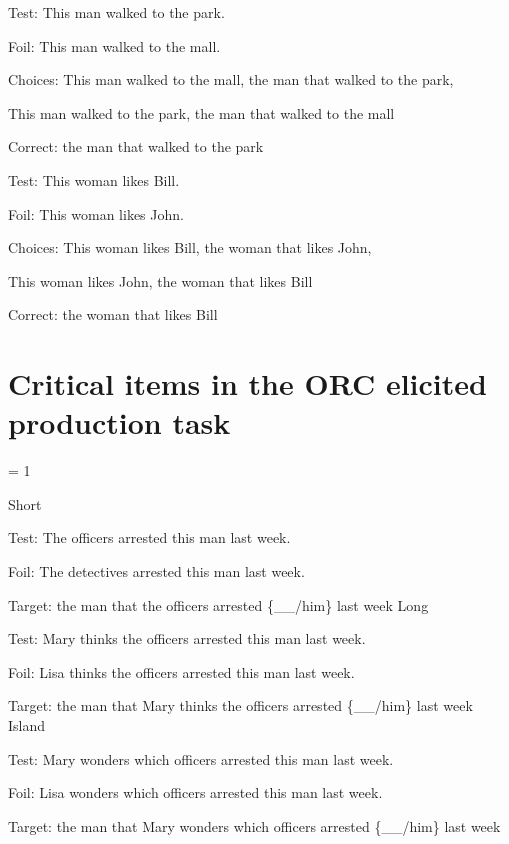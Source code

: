 \ex %
Test: This man walked to the park.\par\nobreak
Foil: This man walked to the mall.\par\nobreak
Choices: This man walked to the mall, the man that walked to the park,\par\nobreak
This man walked to the park, the man that walked to the mall\par\nobreak
Correct: the man that walked to the park
\xe

\ex %
Test: This woman likes Bill.\par\nobreak
Foil: This woman likes John.\par\nobreak
Choices: This woman likes Bill, the woman that likes John,\par\nobreak
This woman likes John, the woman that likes Bill\par\nobreak
Correct: the woman that likes Bill
\xe

\section{Critical items in the ORC elicited production task}

\excnt = 1

\pex %
\a Short\par\nobreak
Test: The officers arrested this man last week.\par\nobreak
Foil: The detectives arrested this man last week.\par\nobreak
Target: the man that the officers arrested \{\_\_/him\} last week
\a Long\par\nobreak
Test: Mary thinks the officers arrested this man last week.\par\nobreak
Foil: Lisa thinks the officers arrested this man last week.\par\nobreak
Target: the man that Mary thinks the officers arrested \{\_\_/him\} last week
\a Island\par\nobreak
Test: Mary wonders which officers arrested this man last week.\par\nobreak
Foil: Lisa wonders which officers arrested this man last week.\par\nobreak
Target: the man that Mary wonders which officers arrested \{\_\_/him\} last week
\xe

